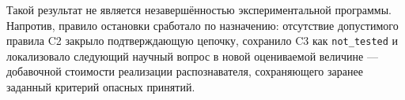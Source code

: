 Такой результат не является незавершённостью экспериментальной программы.
Напротив, правило остановки сработало по назначению: отсутствие допустимого
правила C2 закрыло подтверждающую цепочку, сохранило C3 как
\texttt{not\_tested} и локализовало следующий научный вопрос в новой
оцениваемой величине --- добавочной стоимости реализации распознавателя,
сохраняющего заранее заданный критерий опасных принятий.
